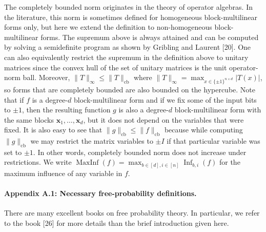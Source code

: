 \documentclass[10pt,a4paper]{article}
\begin{document}
The completely bounded norm originates in the theory of operator algebras. In the literature, this norm is sometimes defined for homogeneous block-multilinear forms only, but here we extend the definition to non-homogeneous block-multilinear forms.
The supremum above is always attained and can be computed by solving a semidefinite program as shown by Gribling and Laurent [20]. One can also equivalently restrict the supremum in the definition above to unitary matrices since the convex hull of the set of unitary matrices is the unit operator-norm ball. Moreover, $\|T\|_\infty\leq\|T\|_{\mathrm{cb}}$ where $\|T\|_\infty=\max_{x\in\{\pm1\}^{n\times d}}|T(x)|$, so forms that are completely bounded are also bounded on the hypercube.
Note that if $f$ is a degree-$d$ block-multilinear form and if we fix some of the input bits to $\pm1$, then the resulting function $g$ is also a degree-$d$ block-multilinear form with the same blocks $\mathbf x_1,\ldots,\mathbf x_d$, but it does not depend on the variables that were fixed. It is also easy to see that $\|g\|_{\mathrm{cb}}\leq\|f\|_{\mathrm{cb}}$ because while computing $\|g\|_{\mathrm{cb}}$ we may restrict the matrix variables to $\pm I$ if that particular variable was set to $\pm1$. In other words, completely bounded norm does not increase under restrictions.
We write $\operatorname{MaxInf}(f)=\max_{b\in[d],i\in[n]}\operatorname{Inf}_{b,i}(f)$ for the maximum influence of any variable in $f$.

\paragraph{Appendix A.1: Necessary free-probability definitions.}
There are many excellent books on free probability theory. In particular, we refer to the book [26] for more details than the brief introduction given here.
\end{document}
